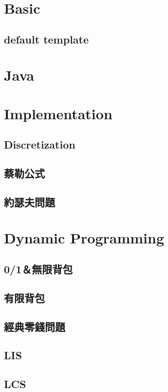 \section{Basic}
	\subsection{default template}
		
\section{Java}
	
\section{Implementation}
	\subsection{Discretization}
		
	\subsection{蔡勒公式}
		
	\subsection{約瑟夫問題}
		
\section{Dynamic Programming}
	\subsection{0/1＆無限背包}
		
	\subsection{有限背包}
		
	\subsection{經典零錢問題}
		
	\subsection{LIS}
		
	\subsection{LCS}
		
